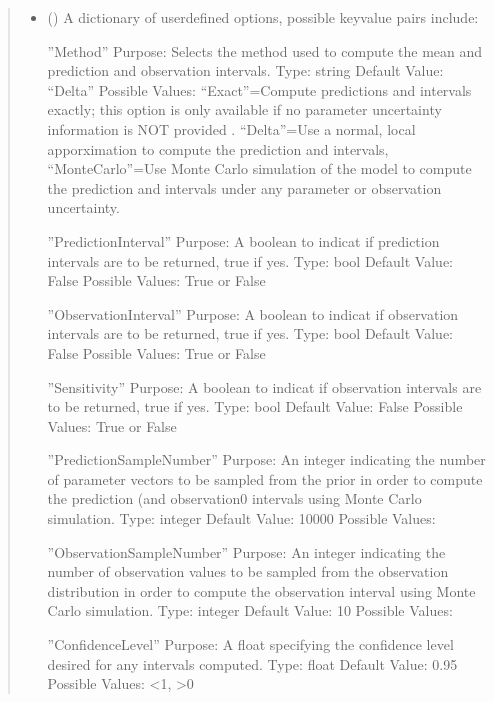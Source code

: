 \documentclass[letterpaper,10pt,english,openany,oneside]{sphinxmanual}
\begin{document}
\begin{fulllineitems}
\begin{fulllineitems}
\begin{quote}
\begin{description}
\begin{itemize}
\item {} 
 (\sphinxstyleliteralemphasis{\sphinxupquote{, }}) \textendash{} 
A dictionary of user\sphinxhyphen{}defined options, possible key\sphinxhyphen{}value
pairs include:

”Method” \textendash{}
Purpose: Selects the method used to compute the mean and prediction and observation
intervals.
Type: string
Default Value: “Delta”
Possible Values: “Exact”=Compute predictions and intervals exactly; this
option is only available if no parameter uncertainty information is NOT provided .
“Delta”=Use a normal, local apporximation to compute the prediction and
intervals, “MonteCarlo”=Use Monte Carlo simulation of the model to compute the
prediction and intervals under any parameter or observation uncertainty.

”PredictionInterval” \textendash{}
Purpose: A boolean to indicat if prediction intervals are to be returned, true if yes.
Type: bool
Default Value: False
Possible Values: True or False

”ObservationInterval” \textendash{}
Purpose: A boolean to indicat if observation intervals are to be returned, true if yes.
Type: bool
Default Value: False
Possible Values: True or False

”Sensitivity” \textendash{}
Purpose: A boolean to indicat if observation intervals are to be returned, true if yes.
Type: bool
Default Value: False
Possible Values: True or False

”PredictionSampleNumber” \textendash{}
Purpose: An integer indicating the number of parameter vectors to be sampled from
the prior in order to compute the prediction (and observation0 intervals using Monte
Carlo simulation.
Type: integer
Default Value: 10000
Possible Values:

”ObservationSampleNumber” \textendash{}
Purpose: An integer indicating the number of observation values to be sampled from
the observation distribution in order to compute the observation interval using
Monte Carlo simulation.
Type: integer
Default Value: 10
Possible Values:

”ConfidenceLevel” \textendash{}
Purpose: A float specifying the confidence level desired for any intervals computed.
Type: float
Default Value: 0.95
Possible Values: \textless{}1, \textgreater{}0


\end{itemize}


\end{description}
\end{quote}
\end{fulllineitems}
\end{fulllineitems}
\end{document}
